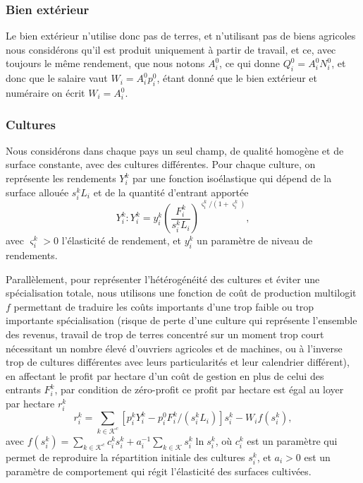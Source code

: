 \subsubsection{Bien extérieur}
Le bien extérieur n’utilise donc pas de terres, et n’utilisant pas de biens agricoles nous considérons qu’il est produit uniquement à partir de travail, et ce, avec toujours le même rendement, que nous notons $A_i^0$, ce qui donne $Q_i^0 = A_i^0 N_i^0$, et donc que le salaire vaut $W_i = A_i^0 p_i^0$, étant donné que le bien extérieur et numéraire on écrit $W_i=A_i^0$.

\subsubsection{Cultures}

Nous considérons dans chaque pays un seul champ, de qualité homogène et de surface constante, avec des cultures différentes. Pour chaque culture, on représente les rendements $Y_i^k$ par une fonction isoélastique qui dépend de la surface allouée $s_i^k L_i$ et de la quantité d’entrant apportée
\begin{equation}\label{eq_yik}
    Y_i^k: Y_i^k = y_i^k \left( \frac{F_i^k}{s_i^k L_i} \right) ^{\varsigma_i^k/(1+\varsigma_i^k)},
\end{equation}
avec $\varsigma_i^k > 0$ l’élasticité de rendement, et $y_i^k$ un paramètre de niveau de rendements.

Parallèlement, pour représenter l’hétérogénéité des cultures et éviter une spécialisation totale, nous utilisons une fonction de coût de production multilogit $f$ permettant de traduire les coûts importants d’une trop faible ou trop importante spécialisation (risque de perte d’une culture qui représente l’ensemble des revenus, travail de trop de terres concentré sur un moment trop court nécessitant un nombre élevé d’ouvriers agricoles et de machines, ou à l’inverse trop de cultures différentes avec leurs particularités et leur calendrier différent), en affectant le profit par hectare d’un coût de gestion en plus de celui des entrants $F_i^k$, par condition de zéro-profit ce profit par hectare est égal au loyer par hectare $r_i^k$
\begin{equation}\label{eq_rik}
    r_i^k = \sum_{k \in \mathcal{K}^c} [p_i^k Y_i^k - p_i^0 F_i^k/(s_i^k L_i)]s_i^k - W_i f(s_i^k),
\end{equation}
avec $f(s_i^k) = \sum_{k \in \mathcal{K}^c} c_i^k s_i^k + a_i^{-1} \sum_{k \in \mathcal{K}} s_i^k \ln s_i^k$, où $c_i^k$ est un paramètre qui permet de reproduire la répartition initiale des cultures $s_i^k$, et $a_i > 0$ est un paramètre de comportement qui régit l’élasticité des surfaces cultivées.

